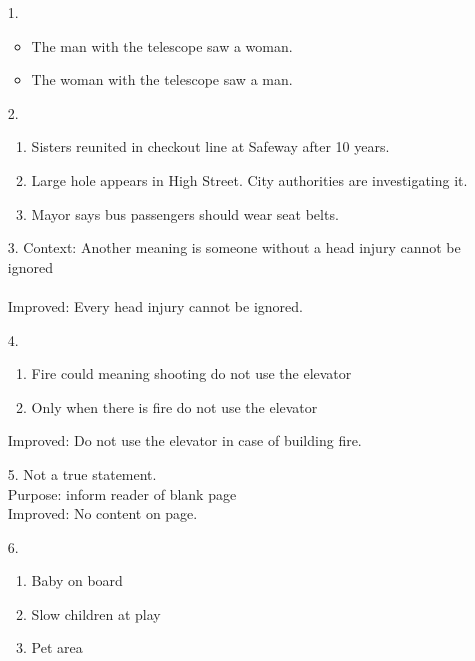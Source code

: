 \documentclass[11pt]{exam}
\author{@dante}
\begin{document}

\begin{enumerate}[leftmargin=0pt]

\item[1.] 
\begin{itemize}
    \item The man with the telescope saw a woman.
    \item The woman with the telescope saw a man.
\end{itemize}

\item[2.]
\begin{enumerate}[label=(\alph*)]
    \item Sisters reunited in checkout line at Safeway after 10 years.
    \item Large hole appears in High Street. City authorities are investigating it.
    \item Mayor says bus passengers should wear seat belts.
\end{enumerate}

\item[3.] Context: Another meaning is someone without a head injury cannot be ignored \\
\\
Improved: Every head injury cannot be ignored.

\item[4.]
\begin{enumerate}[label=(\alph*)]
    \item Fire could meaning shooting do not use the elevator
    \item Only when there is fire do not use the elevator
\end{enumerate}
Improved: Do not use the elevator in case of building fire.

\item[5.] Not a true statement. \\
Purpose: inform reader of blank page \\
Improved: No content on page.

\item[6.] 
\begin{enumerate}[label=(\alph*)]
    \item Baby on board 
    \item Slow children at play
    \item Pet area
\end{enumerate}


\end{enumerate}
\end{document}
